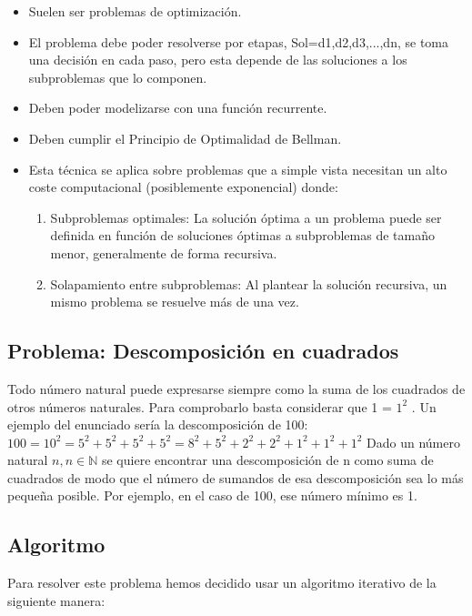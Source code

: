 \documentclass[a4paper,12pt,twoside]{article} %
\begin{document}
\begin{itemize}
    \item Suelen ser problemas de optimización.
    \item El problema debe poder resolverse por etapas, Sol=d1,d2,d3,...,dn, se toma una decisión en cada paso, pero esta depende de las soluciones a los subproblemas que lo componen.
    \item Deben poder modelizarse con una función recurrente.
    \item Deben cumplir el Principio de Optimalidad de Bellman.
    \item Esta técnica se aplica sobre problemas que a simple vista necesitan un alto coste computacional (posiblemente exponencial) donde:

    \begin{enumerate}
        \item Subproblemas optimales: La solución óptima a un problema puede ser definida en función de soluciones óptimas a subproblemas de tamaño menor, generalmente de forma recursiva.
        \item Solapamiento entre subproblemas: Al plantear la solución recursiva, un mismo problema se resuelve más de una vez.
    \end{enumerate}
    
\end{itemize} 

\newpage



\subsection{Problema: Descomposición en cuadrados}
Todo número natural puede expresarse siempre como la suma de los cuadrados de otros números naturales. Para comprobarlo basta considerar que 
1 = $1^2$ . Un ejemplo del enunciado sería la descomposición de 100:
$100 = 10^2 = 5^2 + 5^2 + 5^2 + 5^2 = 8^2 + 5^2 + 2^2 + 2^2 + 1^2 + 1^2 + 1^2$
Dado un número natural $n, n \in \mathbb{N}$ se quiere encontrar una descomposición
de n como suma de cuadrados de modo que el número de sumandos de esa descomposición sea lo más pequeña posible. Por ejemplo, en el caso de 100, ese número mínimo es 1.



\subsection{Algoritmo}
Para resolver este problema hemos decidido usar un algoritmo iterativo de la siguiente manera:\\
\end{document}
